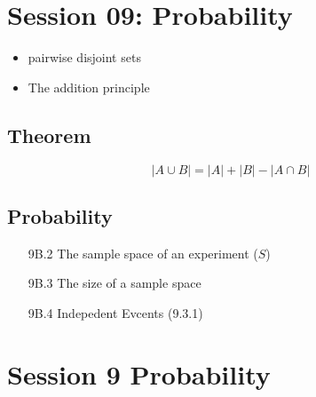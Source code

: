 \documentclass[12pt]{report}
\begin{document}
\section*{Session 09: Probability}
	
		\begin{itemize}
			\item pairwise disjoint sets
			\item The addition principle
		\end{itemize}
		\subsection*{Theorem}
		\[ |A \cup B| = |A| + |B| - |A \cap B|  \]
		
		\subsection*{Probability}
		\begin{itemize}
			\item[9B.2] The sample space of an experiment ($S$)
			\item[9B.3] The size of a sample space
			\item[9B.4] Indepedent Evcents (9.3.1)
		\end{itemize}
		\section*{Session 9 Probability}

		
\end{document}
